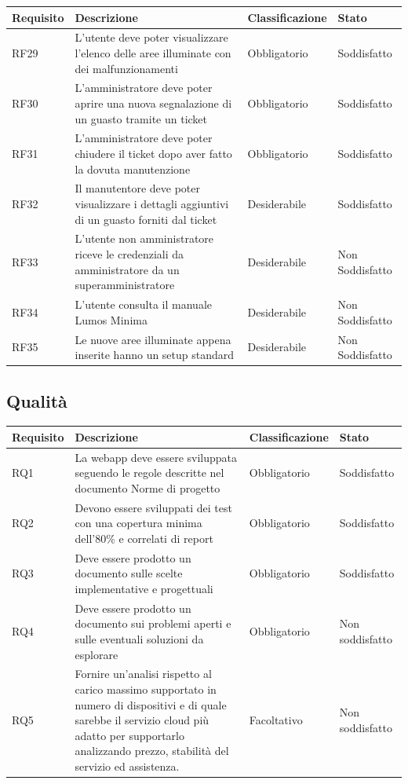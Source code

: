 \documentclass[12pt]{article}
\begin{document}
\begin{tabular}{ |p{1.8cm}|p{5.2cm}|p{2.5cm}| p{3.5cm}| }
	\hline
	Requisito& Descrizione &Classificazione & Stato \\
	\hline	
	RF29	 & L'utente deve poter visualizzare l'elenco delle aree illuminate con dei malfunzionamenti & Obbligatorio & Soddisfatto \\
	\hline				
	RF30	 & L'amministratore deve poter aprire una nuova segnalazione di un guasto tramite un ticket & Obbligatorio & Soddisfatto \\
	\hline				
	RF31	 & L'amministratore deve poter chiudere il ticket dopo aver fatto la dovuta manutenzione & Obbligatorio & Soddisfatto \\
	\hline				
	RF32	 & Il manutentore deve poter visualizzare i dettagli aggiuntivi di un guasto forniti dal ticket & Desiderabile & Soddisfatto \\
	\hline				
	RF33	 & L'utente non amministratore riceve le credenziali da amministratore da un superamministratore & Desiderabile & Non Soddisfatto \\
	\hline				
	RF34	 & L'utente consulta il manuale Lumos Minima & Desiderabile & Non Soddisfatto \\
	\hline				
	RF35	 & Le nuove aree illuminate appena inserite hanno un setup standard & Desiderabile & Non Soddisfatto \\
	\hline				
	\end{tabular}
	
	\subsection{Qualità}
	\begin{tabular}{ |p{1.8cm}|p{5.2cm}|p{3cm}| p{2cm}| }
	\hline
	Requisito& Descrizione &Classificazione & Stato \\
	\hline
	RQ1 & La webapp deve essere sviluppata seguendo le regole descritte nel documento Norme di progetto & Obbligatorio & Soddisfatto \\
	RQ2 & Devono essere sviluppati dei test con una copertura minima dell'80\% e correlati di report & Obbligatorio & Soddisfatto\\
	RQ3 & Deve essere prodotto un documento sulle scelte implementative e progettuali & Obbligatorio & Soddisfatto \\
	RQ4 & Deve essere prodotto un documento sui problemi aperti e sulle eventuali soluzioni da esplorare & Obbligatorio & Non soddisfatto \\
	RQ5 & Fornire un’analisi rispetto al carico massimo supportato in numero di dispositivi e di quale sarebbe il servizio cloud più adatto per supportarlo analizzando prezzo, stabilità del servizio ed assistenza.  &  Facoltativo & Non soddisfatto \\
	\hline
	
	\end{tabular}
\end{document}
